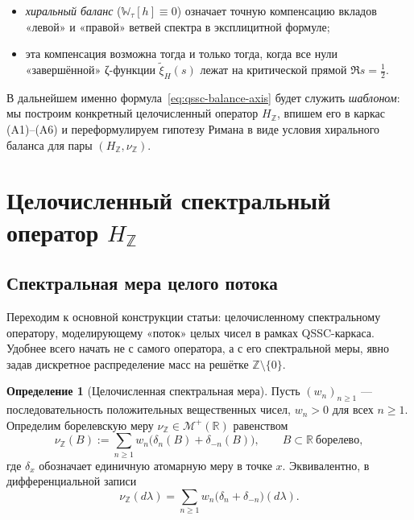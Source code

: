 \documentclass{article}
\numberwithin{equation}{section}
\theoremstyle{plain}
\theoremstyle{definition}
\newtheorem{definition}{Определение}
\theoremstyle{remark}
\def\delta{δ}\def\Delta{Δ}\def\epsilon{ε}\def\zeta{ζ}%
\begin{document}
\begin{itemize}[leftmargin=2.2em]
  \item \emph{хиральный баланс} ($\mathbb W_\tau[h]\equiv0$) означает точную
  компенсацию вкладов «левой» и «правой» ветвей спектра в эксплицитной
  формуле;

  \item эта компенсация возможна тогда и только тогда, когда все нули
  «завершённой» ζ-функции $\widetilde{\xi}_H(s)$ лежат на критической
  прямой $\Re s=\tfrac12$.
\end{itemize}

\noindent
В дальнейшем именно формула~\eqref{eq:qssc-balance-axis} будет служить
\emph{шаблоном}: мы построим конкретный целочисленный оператор $H_{\mathbb Z}$,
впишем его в каркас (A1)–(A6) и переформулируем гипотезу Римана в виде
условия хирального баланса для пары $(H_{\mathbb Z},\nu_{\mathbb Z})$.
\clearpage


\section{Целочисленный спектральный оператор \(H_{\mathbb Z}\)}
\label{sec:integer-operator}

\subsection{Спектральная мера целого потока}
\label{subsec:integer-measure}

\noindent
Переходим к основной конструкции статьи: целочисленному спектральному
оператору, моделирующему «поток» целых чисел в рамках QSSC-каркаса.
Удобнее всего начать не с самого оператора, а с его спектральной меры,
явно задав дискретное распределение масс на решётке \(\mathbb Z\setminus\{0\}\).

\begin{definition}[Целочисленная спектральная мера]
\label{def:nu-Z}
Пусть \((w_n)_{n\ge 1}\) — последовательность положительных вещественных чисел,
\(w_n>0\) для всех \(n\ge 1\). Определим борелевскую меру
\(\nu_{\mathbb Z}\in\mathcal M^+(\mathbb R)\) равенством
\begin{equation}
\label{eq:nu-Z-def}
\nu_{\mathbb Z}(B)
:=
\sum_{n\ge 1}
w_n\big(\delta_n(B)+\delta_{-n}(B)\big),
\qquad
B\subset\mathbb R\ \text{борелево},
\end{equation}
где \(\delta_x\) обозначает единичную атомарную меру в точке \(x\).
Эквивалентно, в дифференциальной записи
\begin{equation}
\label{eq:nu-Z-diff}
\nu_{\mathbb Z}(d\lambda)
=
\sum_{n\ge 1} w_n\big(\delta_n+\delta_{-n}\big)(d\lambda).
\end{equation}
\end{definition}
\end{document}
